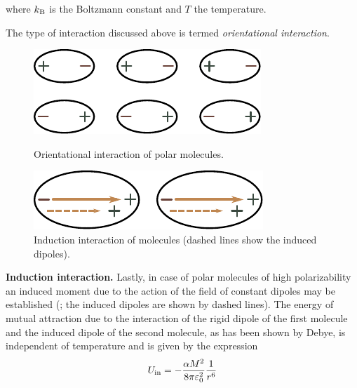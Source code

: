 \noindent
where $k_{\text{B}}$ is the Boltzmann constant and  $T$ the temperature.

The type of interaction discussed above is termed \textit{orientational interaction}.

\begin{figure}[t]
	\begin{minipage}[t]{0.48\linewidth}
		\begin{center}
			\includegraphics[scale=0.95]{figures/ch_01/fig_1_2.pdf}
			\caption[]{Orientational interaction of polar molecules.}
			\label{fig:1_2}
		\end{center}
	\end{minipage}
	\hfill{ }%
	\begin{minipage}[t]{0.48\linewidth}
		\begin{center}
			\includegraphics[scale=0.95]{figures/ch_01/fig_1_3.pdf}
			\caption[]{Induction interaction of molecules (dashed lines show the induced dipoles).}
			\label{fig:1_3}
		\end{center}
	\end{minipage}
\vspace{-0.3cm}
\end{figure}

\textbf{Induction interaction.} Lastly, in case of polar molecules of high polarizability an induced moment due to the action of the field of constant dipoles may be established (; the induced dipoles are shown by dashed lines). The energy of mutual attraction due to the interaction of the rigid dipole of the first molecule and the induced dipole of the second molecule, as has been shown by Debye, is independent of temperature and is given by the expression
\begin{equation}\label{eq:1_5}
	U_{\text{in}} = - \frac{\alpha M^2}{8\pi\varepsilon_0^2}\frac{1}{r^6}
\end{equation}

